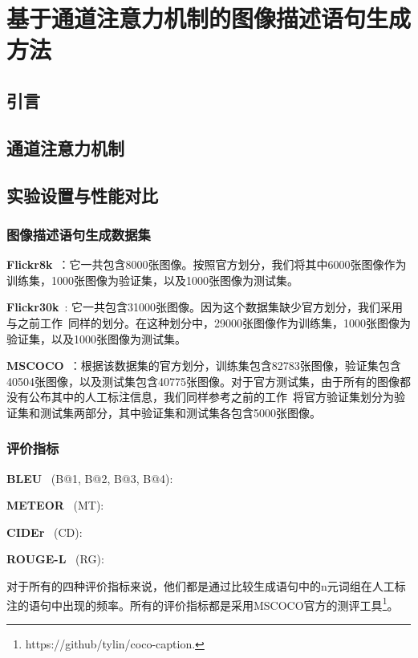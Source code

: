 \chapter{基于通道注意力机制的图像描述语句生成方法}

\section{引言}

\section{通道注意力机制}

\section{实验设置与性能对比}
\subsection{图像描述语句生成数据集}
\noindent\textbf{Flickr8k}~\cite{hodosh2013framing}：它一共包含8000张图像。按照官方划分，我们将其中6000张图像作为训练集，1000张图像为验证集，以及1000张图像为测试集。

\noindent\textbf{Flickr30k}~\cite{young2014image}: 它一共包含31000张图像。因为这个数据集缺少官方划分，我们采用与之前工作~\cite{karpathy2015deep}同样的划分。在这种划分中，29000张图像作为训练集，1000张图像为验证集，以及1000张图像为测试集。

\noindent\textbf{MSCOCO}~\cite{lin2014microsoft}：根据该数据集的官方划分，训练集包含82783张图像，验证集包含40504张图像，以及测试集包含40775张图像。对于官方测试集，由于所有的图像都没有公布其中的人工标注信息，我们同样参考之前的工作~\cite{karpathy2015deep}将官方验证集划分为验证集和测试集两部分，其中验证集和测试集各包含5000张图像。


\subsection{评价指标}
\noindent\textbf{BLEU}~\cite{papineni2002bleu} (B@1, B@2, B@3, B@4):

\noindent\textbf{METEOR}~\cite{banerjee2005meteor} (MT):

\noindent\textbf{CIDEr}~\cite{vedantam2015cider} (CD):

\noindent\textbf{ROUGE-L}~\cite{lin2002manual} (RG):


对于所有的四种评价指标来说，他们都是通过比较生成语句中的n元词组在人工标注的语句中出现的频率。所有的评价指标都是采用MSCOCO官方的测评工具\footnote{https://github/tylin/coco-caption.}。



